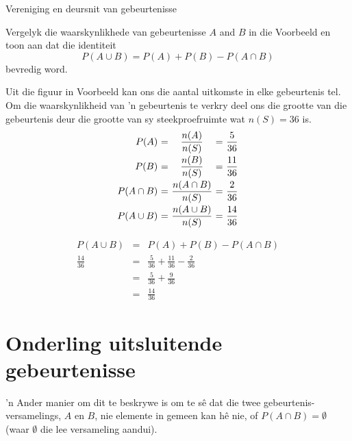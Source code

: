 \begin{wex}{Vereniging en deursnit van gebeurtenisse}{
  Vergelyk die waarskynlikhede van gebeurtenisse $A$ and $B$ in die Voorbeeld  en toon aan dat die identiteit 
\[P(A \cup B) = P(A) + P(B) - P(A \cap B)\]
bevredig word.

}{
  
Uit die figuur in Voorbeeld  kan ons die aantal uitkomste in elke gebeurtenis tel. Om die waarskynlikheid van 'n gebeurtenis te verkry deel ons die grootte van die gebeurtenis deur die grootte van sy steekproefruimte wat $n(S)=36$ is.
  \[\begin{array}{r@{$\ =\ $}c@{$\ =\ $}l}
    P(A)        & \dfrac{n(A)}{n(S)}        & \dfrac{5}{36}  \\[8pt]
    P(B)        & \dfrac{n(B)}{n(S)}        & \dfrac{11}{36} \\[8pt]
    P(A \cap B) & \dfrac{n(A \cap B)}{n(S)} & \dfrac{2}{36}  \\[8pt]
    P(A \cup B) & \dfrac{n(A \cup B)}{n(S)} & \dfrac{14}{36}
  \end{array}\]


  \begin{eqnarray*}
    P(A \cup B) &=& P(A) + P(B) - P(A \cap B) \\
    \frac{14}{36} &=& \frac{5}{36} + \frac{11}{36} - \frac{2}{36} \\
    &=& \frac{5}{36} + \frac{9}{36} \\
    &=& \frac{14}{36} \qquad\qquad
  \end{eqnarray*}
}
\end{wex}

\section{Onderling uitsluitende gebeurtenisse}

'n Ander manier om dit te beskrywe is om te s\^e dat die twee gebeurtenis-versamelings, $A$ en $B$, nie elemente in gemeen kan h\^e nie, of $P(A \cap B) = \emptyset$
(waar $\emptyset$ die lee versameling aandui).

